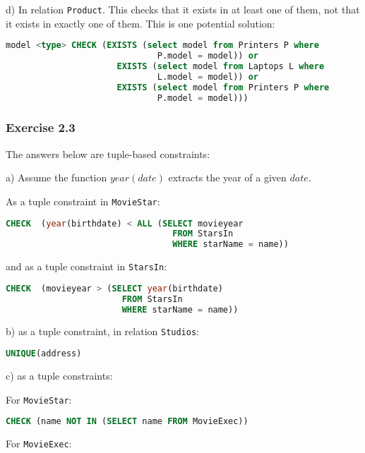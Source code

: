 \documentclass[../../main.tex]{subfiles}
\begin{document}
d) In relation \verb|Product|. This checks that it exists in at least one of them, not that it exists in
exactly one of them. This is one potential solution:

\begin{lstlisting}[language=sql]
  model <type> CHECK (EXISTS (select model from Printers P where
                              P.model = model)) or
                      EXISTS (select model from Laptops L where
                              L.model = model)) or
                      EXISTS (select model from Printers P where
                              P.model = model)))
\end{lstlisting}


\subsubsection*{Exercise 2.3}

The answers below are tuple-based constraints:

a) Assume the function $year(date)$ extracts the year of a given $date$.

As a tuple constraint in \verb|MovieStar|:

\begin{lstlisting}[language=sql]
  CHECK  (year(birthdate) < ALL (SELECT movieyear
                                 FROM StarsIn
                                 WHERE starName = name))
\end{lstlisting}

and as a tuple constraint in \verb|StarsIn|:

\begin{lstlisting}[language=sql]
  CHECK  (movieyear > (SELECT year(birthdate)
                       FROM StarsIn
                       WHERE starName = name))
\end{lstlisting}

b) as a tuple constraint, in relation \verb|Studios|:

\begin{lstlisting}[language=sql]
  UNIQUE(address)
\end{lstlisting}

c) as a tuple constraints:

For \verb|MovieStar|:

\begin{lstlisting}[language=sql]
  CHECK (name NOT IN (SELECT name FROM MovieExec))
\end{lstlisting}

For \verb|MovieExec|:
\end{document}
